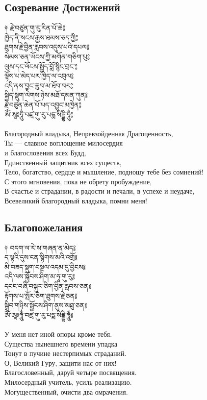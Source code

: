 \subsection{Созревание Достижений}
\vspace{0.5cm}
\ti
༈ རྗེ་བཙུན་གུ་རུ་རིན་པོ་ཆེ༔ \\
ཁྱེད་ནི་སངས་རྒྱས་ཐམས་ཅད་ཀྱི༔ \\
ཐུགས་རྗེ་བྱིན་རླབས་འདུས་པའི་དཔལ༔ \\
སེམས་ཅན་ཡོངས་ཀྱི་མགོན་གཅིག་པུ༔ \\
ལུས་དང་ལོངས་སྤྱོད་བློ་སྙིང་བྲང་༔ \\
ལྟོས་པ་མེད་པར་ཁྱེད་ལ་འབུལ༔ \\
འདི་ནས་བྱང་ཆུབ་མ་ཐོབ་བར༔\\
སྐྱིད་སྡུག་ལེགས་ཉེས་མཐོ་དམན་ཀུན༔\\
རྗེ་བཙུན་ཆེན་པོ་པད་འབྱུང་མཁྱེན༔\\
ཨོཾ་ཨཱཿཧཱུྂ་བཛྲ་གུ་རུ་པདྨ་སིདྡྷི་ཧཱུྂ༔\\
\\
\ru
Благородный владыка, Непревзойденная Драгоценность,\\
Ты — славное воплощение милосердия \\
\indent и благословения всех Будд,\\
Единственный защитник всех существ,\\
Тело, богатство, сердце и мышление, подношу тебе без сомнений!\\
С этого мгновения, пока не обрету пробуждение,\\
В счастье и страдании, в радости и печали, в успехе и неудаче,\\
Всевеликий благородный владыка, помни меня!
\newpage
\subsection{Благопожелания}
\vspace{0.5cm}
\ti
༈ བདག་ལ་རེ་ས་གཞན་ན་མེད༔\\
ད་ལྟའི་དུས་ངན་སྙིགས་མའི་འགྲོ༔\\
མི་བཟད་སྡུག་བསྔལ་འདམ་དུ་བྱིངས༔\\
འདི་ལས་སྐྱོབས་ཤིག་མ་ཧཱ་གུ་རུ༔\\
དབང་བཞི་བསྐུར་ཅིག་བྱིན་རླབས་ཅན༔\\
རྟོགས་པ་སྤོར་ཅིག་ཐུགས་རྗེ་ཅན༔\\
སྒྲིབ་གཉིས་སྦྱོངས་ཤིག་ནུས་མཐུ་ཅན༔\\
ཨོཾ་ཨཱཿཧཱུྂ་བཛྲ་གུ་རུ་པདྨ་སིདྡྷི་ཧཱུྂ༔\\
\\
\ru
У меня нет иной опоры кроме тебя.\\
Существа нынешнего времени упадка\\
Тонут в пучине нестерпимых страданий.\\
О, Великий Гуру, защити нас от них!\\
Благословенный, даруй четыре посвящения.\\
Милосердный учитель, усиль реализацию.\\
Могущественный, очисти два омрачения.\\
\newpage

